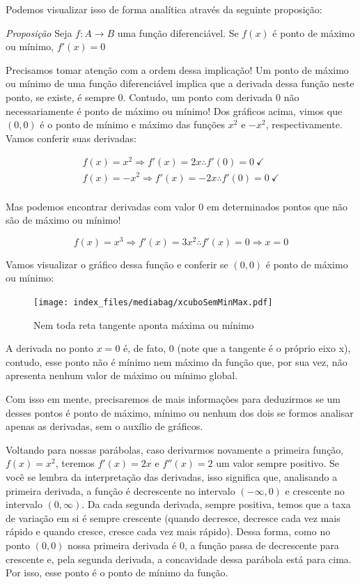 \documentclass[
  portuguese,
  letterpaper,
  DIV=11,
  numbers=noendperiod]{scrreport}
\begin{document}
Podemos visualizar isso de forma analítica através da seguinte
proposição:

\emph{Proposição} Seja \(f: A\rightarrow B\) uma função diferenciável.
Se \(f(x)\) é ponto de máximo ou mínimo, \(f'(x) = 0\)

Precisamos tomar atenção com a ordem dessa implicação! Um ponto de
máximo ou mínimo de uma função diferenciável implica que a derivada
dessa função neste ponto, se existe, é sempre 0. Contudo, um ponto com
derivada 0 não necessariamente é ponto de máximo ou mínimo! Dos gráficos
acima, vimos que \((0,0)\) é o ponto de mínimo e máximo das funções
\(x^2\) e \(-x^2\), respectivamente. Vamos conferir suas derivadas:

\[
\begin{aligned}
    f(x) = x^2 \Rightarrow f'(x) = 2x \therefore f'(0) = 0~ \checkmark \\
    f(x) = -x^2 \Rightarrow f'(x) = -2x \therefore f'(0) = 0 ~\checkmark \\
\end{aligned}
\]

Mas podemos encontrar derivadas com valor 0 em determinados pontos que
não são de máximo ou mínimo!

\[
f(x) = x^3 \Rightarrow f'(x) = 3x^2 \therefore f'(x) = 0 \Rightarrow x = 0
\]

Vamos visualizar o gráfico dessa função e conferir se \((0,0)\) é ponto
de máximo ou mínimo:

\begin{figure}[H]

\caption{Nem toda reta tangente aponta máxima ou mínimo}

{\centering \texttt{[image: index\_files/mediabag/xcuboSemMinMax.pdf]}

}

\end{figure}%

A derivada no ponto \(x=0\) é, de fato, \(0\) (note que a tangente é o
próprio eixo x), contudo, esse ponto não é mínimo nem máximo da função
que, por sua vez, não apresenta nenhum valor de máximo ou mínimo global.

Com isso em mente, precisaremos de mais informações para deduzirmos se
um desses pontos é ponto de máximo, mínimo ou nenhum dos dois se formos
analisar apenas as derivadas, sem o auxílio de gráficos.

Voltando para nossas parábolas, caso derivarmos novamente a primeira
função, \(f(x) = x^2\), teremos \(f'(x) = 2x\) e \(f''(x) = 2\) um valor
sempre positivo. Se você se lembra da interpretação das derivadas, isso
significa que, analisando a primeira derivada, a função é decrescente no
intervalo \((-\infty, 0)\) e crescente no intervalo \((0, \infty)\). Da
cada segunda derivada, sempre positiva, temos que a taxa de variação em
si é sempre crescente (quando decresce, decresce cada vez mais rápido e
quando cresce, cresce cada vez mais rápido). Dessa forma, como no ponto
\((0,0)\) nossa primeira derivada é 0, a função passa de decrescente
para crescente e, pela segunda derivada, a concavidade dessa parábola
está para cima. Por isso, esse ponto é o ponto de mínimo da função.
\end{document}
